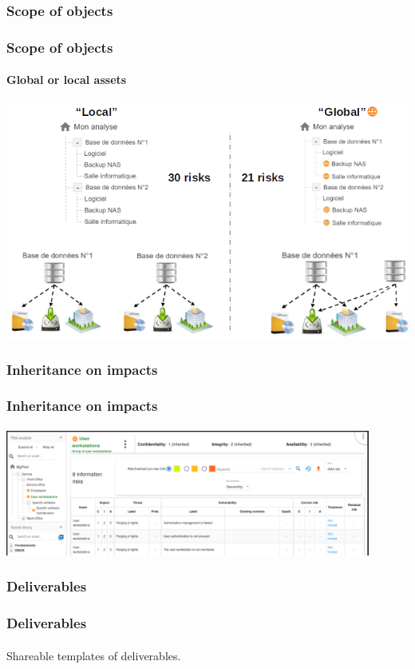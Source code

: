 \subsubsection{Scope of objects}
\begin{frame}
    \frametitle{Scope of objects}
    \framesubtitle{Global or local assets}
    \begin{center}
        \begin{center}
            \includegraphics[scale=0.45]{../common_pictures/global-vs-local.png}
        \end{center}
    \end{center}
\end{frame}

\subsubsection{Inheritance on impacts}
\begin{frame}
    \frametitle{Inheritance on impacts}
    \framesubtitle{}
    \begin{center}
        \begin{center}
            \includegraphics[width=12cm]{../common_pictures/impacts-inheritance.png}
        \end{center}
    \end{center}
\end{frame}

\subsubsection{Deliverables}
\begin{frame}
    \frametitle{Deliverables}
    \framesubtitle{}
    Shareable templates of deliverables.
\end{frame}
